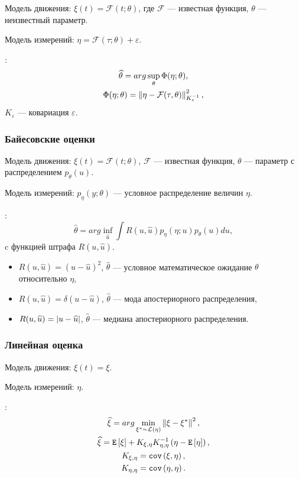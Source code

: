 Модель движения: $\xi(t) = \mathcal{F}(t; \theta)$, где $\mathcal{F}$ --- известная функция, $\theta$ --- неизвестный параметр.

Модель измерений: $\eta = \mathcal{F}(\tau; \theta) + \varepsilon$.

:
\begin{gather*}
    \widehat{\theta} = arg \sup \limits_\theta \Phi(\eta; \theta) , \\
    \Phi(\eta; \theta) = \left \| \eta - \mathcal{F}(\tau, \theta) \right \|_{K_\varepsilon^{-1}}^2 ,
\end{gather*}
$K_\varepsilon$ --- ковариация $\varepsilon$.

\subsubsection{Байесовские оценки}

Модель движения: $\xi(t) = \mathcal{F}(t; \theta)$, $\mathcal{F}$ --- известная функция, $\theta$ --- параметр с распределением $p_\theta(u)$.

Модель измерений: $p_\eta(y; \theta)$ --- условное распределение величин $\eta$.

:
\[
    \widehat{\theta} = arg \inf \limits_{\widehat{u}} \int R(u, \widehat{u}) p_\eta(\eta; u) p_\theta(u) du ,
\]
c функцией штрафа $R(u, \widehat{u})$.
\begin{itemize}
    \item $R(u,\widehat{u}) = (u - \widehat{u})^2$, $\widehat{\theta}$ --- условное математическое ожидание $\theta$ относительно $\eta$,
    \item $R(u,\widehat{u}) = \delta(u - \widehat{u})$, $\widehat{\theta}$ --- мода апостериорного распределения,
    \item $R(u,\widehat{u}) = \left | u - \widehat{u} \right |$, $\widehat{\theta}$ --- медиана апостериорного распределения.
\end{itemize}

\subsubsection{Линейная оценка}

Модель движения: $\xi(t) = \xi$.

Модель измерений: $\eta$.

:
\begin{gather*}
    \widehat{\xi} = arg \min \limits_{\xi^* \sim \mathcal{L} \left ( \eta \right )} \left \| \xi - \xi^* \right \|^2 , \\
    \widehat{\xi} = \mathtt{E} \left[ \xi \right] + K_{\xi,\eta} K_{\eta,\eta}^{-1} \left ( \eta - \mathtt{E} \left[ \eta \right] \right ) , \\
    K_{\xi,\eta} = \mathtt{cov} \left( \xi, \eta \right) , \\
    K_{\eta,\eta} = \mathtt{cov} \left( \eta, \eta \right) .
\end{gather*}

